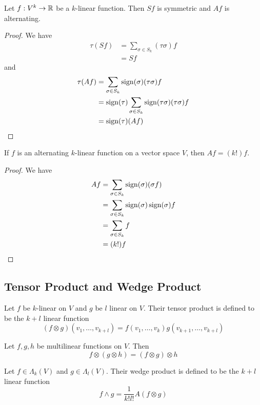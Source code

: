 \documentclass[a4paper]{article}
\begin{document}
\begin{prp} Let $f:V^k\to\mathbb{R}$ be a $k$-linear function. Then $Sf$ is symmetric and $Af$ is alternating. 
\end{prp}
\begin{proof} We have 
\begin{align*}
\tau(Sf)&=\sum_{\sigma\in S_k}(\tau\sigma)f\\
&=Sf
\end{align*} and
\begin{align*}\tau(Af)&=\sum_{\sigma\in S_k}\operatorname{sign}(\sigma)(\tau\sigma)f\\
&=\operatorname{sign}(\tau)\sum_{\sigma\in S_k}\operatorname{sign}(\tau\sigma)(\tau\sigma)f\\
&=\operatorname{sign}(\tau)(Af)
\end{align*}
\end{proof}

\begin{lmm} If $f$ is an alternating $k$-linear function on a vector space $V$, then $Af=(k!)f$. 
\end{lmm}
\begin{proof} We have
\begin{align*}
Af&=\sum_{\sigma\in S_k}\operatorname{sign}(\sigma)(\sigma f)\\
&=\sum_{\sigma\in S_k}\operatorname{sign}(\sigma)\operatorname{sign}(\sigma)f\\
&=\sum_{\sigma\in S_k}f\\
&=(k!)f
\end{align*}
\end{proof}

\subsection{Tensor Product and Wedge Product}
\begin{defn} Let $f$ be $k$-linear on $V$ and $g$ be $l$ linear on $V$. Their tensor product is defined to be the $k+l$ linear function $$(f\otimes g)(v_1,\dots,v_{k+l})=f(v_1,\dots,v_k)g(v_{k+1},\dots,v_{k+l})$$
\end{defn}

\begin{prp} Let $f,g,h$ be multilinear functions on $V$. Then $$f\otimes(g\otimes h)=(f\otimes g)\otimes h$$
\end{prp}

\begin{defn} Let $f\in\Lambda_k(V)$ and $g\in\Lambda_l(V)$. Their wedge product is defined to be the $k+l$ linear function $$f\wedge g=\frac{1}{k!l!}A(f\otimes g)$$
\end{defn}
\end{document}
